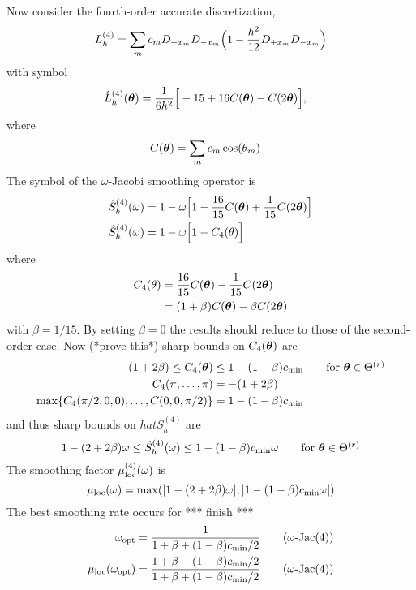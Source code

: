 \documentclass[12pt]{article}
\begin{document}
Now consider the fourth-order accurate discretization,
\[
   L_h^{(4)} = \sum_m c_m D_{+x_m}D_{-x_m}\Big( 1 - {h^2\over12} D_{+x_m}D_{-x_m} \Big)
\]
with symbol
\begin{align*}
  \hat{L}_h^{(4)}(\boldsymbol{\theta}) &= {1\over 6 h^2}\Big[ -15 + 16 C(\boldsymbol{\theta}) - C(2\boldsymbol{\theta}) \Big],
\end{align*}  
where 
\begin{align*}
  C(\boldsymbol{\theta}) &=\sum_m c_m\cos(\theta_m) 
\end{align*}  
The symbol of the $\omega$-Jacobi smoothing operator is
\begin{align*}
    \hat{S}_h^{(4)}(\omega)  &= 1 - \omega \Big[ 1 - {16\over15}C(\boldsymbol{\theta}) + {1\over 15}C(2\boldsymbol{\theta}) \Big] \\
    \hat{S}_h^{(4)}(\omega)  &= 1 - \omega \Big[ 1 - C_4(\theta)  \Big]
\end{align*} 
where
\begin{align*}
     C_4(\theta) &= {16\over15}C(\boldsymbol{\theta}) - {1\over 15}C(2\boldsymbol{\theta}) \\
                 &= (1+\beta)C(\boldsymbol{\theta}) - \beta C(2\boldsymbol{\theta})
\end{align*}   
with $\beta=1/15$. By setting $\beta=0$ the results should reduce to those of the second-order case.
Now (*prove this*) sharp bounds on $C_4(\boldsymbol{\theta})$ are
\begin{align*}
      -(1+2\beta) \le C_4(\boldsymbol{\theta}) &\le 1 - (1-\beta) c_{\rm min} \qquad\mbox{for $\boldsymbol{\theta}\in\Theta^{(r)}$} \\
    C_4(\pi,\ldots,\pi)& =  -(1+2\beta) \\
    \max \{ C_4(\pi/2,0,0),\ldots,C(0,0,\pi/2) \}  &= 1 - (1-\beta) c_{\rm min}
\end{align*} 
and thus sharp bounds on $hat{S}_h^{(4)}$ are
\[
  1 - {(2+2\beta)} \omega  \le  \hat{S}_h^{(4)}(\omega) \le 1 - {(1-\beta)}c_{\rm min}\omega \qquad\mbox{for $\boldsymbol{\theta}\in\Theta^{(r)}$}
\]
The smoothing factor $\mu_{\rm loc}^{(4)}(\omega)$ is 
\[
   \mu_{\rm loc} (\omega) = \max(\vert 1 - {(2+2\beta)} \omega\vert, \vert 1 - {(1-\beta)}c_{\rm min}\omega \vert )
\]
The best smoothing rate occurs for *** finish ***
\begin{align*}
  \omega_{\rm opt} &= {1\over 1+\beta+ (1-\beta)c_{\rm min}/2} \qquad\mbox{($\omega$-Jac(4))}\\
 \mu_{\rm loc}(\omega_{\rm opt}) &= { 1+\beta- (1-\beta)c_{\rm min}/2 \over 1+\beta+ (1-\beta)c_{\rm min}/2} \qquad\mbox{($\omega$-Jac(4))}
\end{align*}
\end{document}
